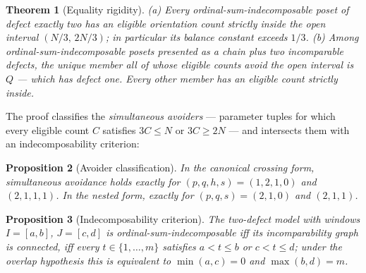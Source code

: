 \documentclass[11pt]{article}
\newtheorem{theorem}{Theorem}[section]
\newtheorem{proposition}[theorem]{Proposition}
\theoremstyle{definition}
\theoremstyle{remark}
\begin{document}
\begin{theorem}[Equality rigidity]\label{thm:rigidity}
\emph{(a)} Every ordinal-sum-indecomposable poset of defect exactly two has an eligible
orientation count strictly inside the open interval $(N/3,\,2N/3)$; in particular its
balance constant exceeds $1/3$.
\emph{(b)} Among ordinal-sum-indecomposable posets presented as a chain plus two
incomparable defects, the unique member all of whose eligible counts avoid the open
interval is $Q$ --- which has defect one. Every other member has an eligible count
strictly inside.
\end{theorem}

The proof classifies the \emph{simultaneous avoiders} --- parameter tuples for which every
eligible count $C$ satisfies $3C\le N$ or $3C\ge2N$ --- and intersects them with an
indecomposability criterion:

\begin{proposition}[Avoider classification]\label{prop:avoiders}
In the canonical crossing form, simultaneous avoidance holds exactly for
$(p,q,h,s)=(1,2,1,0)$ and $(2,1,1,1)$. In the nested form, exactly for
$(p,q,s)=(2,1,0)$ and $(2,1,1)$.
\end{proposition}

\begin{proposition}[Indecomposability criterion]\label{prop:indec}
The two-defect model with windows $I=[a,b]$, $J=[c,d]$ is ordinal-sum-indecomposable iff
its incomparability graph is connected, iff every $t\in\{1,\dots,m\}$ satisfies $a<t\le b$
or $c<t\le d$; under the overlap hypothesis this is equivalent to $\min(a,c)=0$ and
$\max(b,d)=m$.
\end{proposition}
\end{document}
